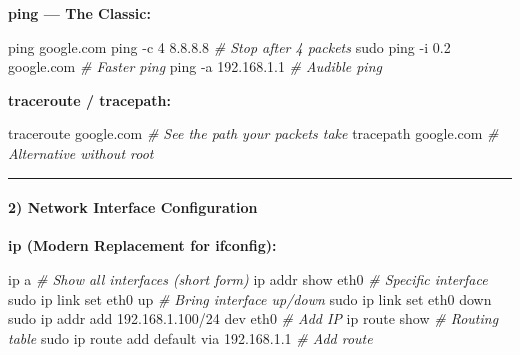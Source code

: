 \documentclass[
  english,
  paper=a4,
  oneside  ,captions=tableheading
]{scrartcl}
\newenvironment{Shaded}{}{}
\newcommand{\AttributeTok}[1]{\textcolor[rgb]{0.49,0.56,0.16}{#1}}
\newcommand{\CommentTok}[1]{\textcolor[rgb]{0.38,0.63,0.69}{\textit{#1}}}
\newcommand{\ExtensionTok}[1]{#1}
\newcommand{\FunctionTok}[1]{\textcolor[rgb]{0.02,0.16,0.49}{#1}}
\newcommand{\NormalTok}[1]{#1}
\begin{document}
\textbf{ping --- The Classic:}

\begin{Shaded}
\begin{Highlighting}[]
\FunctionTok{ping}\NormalTok{ google.com}
\FunctionTok{ping} \AttributeTok{{-}c}\NormalTok{ 4 8.8.8.8           }\CommentTok{\# Stop after 4 packets}
\FunctionTok{sudo}\NormalTok{ ping }\AttributeTok{{-}i}\NormalTok{ 0.2 google.com }\CommentTok{\# Faster ping}
\FunctionTok{ping} \AttributeTok{{-}a}\NormalTok{ 192.168.1.1         }\CommentTok{\# Audible ping}
\end{Highlighting}
\end{Shaded}

\textbf{traceroute / tracepath:}

\begin{Shaded}
\begin{Highlighting}[]
\ExtensionTok{traceroute}\NormalTok{ google.com       }\CommentTok{\# See the path your packets take}
\ExtensionTok{tracepath}\NormalTok{ google.com        }\CommentTok{\# Alternative without root}
\end{Highlighting}
\end{Shaded}

\begin{center}\rule{0.5\linewidth}{0.5pt}\end{center}

\paragraph{2) Network Interface
Configuration}\label{network-interface-configuration}

\textbf{ip (Modern Replacement for ifconfig):}

\begin{Shaded}
\begin{Highlighting}[]
\ExtensionTok{ip}\NormalTok{ a                        }\CommentTok{\# Show all interfaces (short form)}
\ExtensionTok{ip}\NormalTok{ addr show eth0           }\CommentTok{\# Specific interface}
\FunctionTok{sudo}\NormalTok{ ip link set eth0 up    }\CommentTok{\# Bring interface up/down}
\FunctionTok{sudo}\NormalTok{ ip link set eth0 down}
\FunctionTok{sudo}\NormalTok{ ip addr add 192.168.1.100/24 dev eth0  }\CommentTok{\# Add IP}
\ExtensionTok{ip}\NormalTok{ route show               }\CommentTok{\# Routing table}
\FunctionTok{sudo}\NormalTok{ ip route add default via 192.168.1.1   }\CommentTok{\# Add route}
\end{Highlighting}
\end{Shaded}
\end{document}
